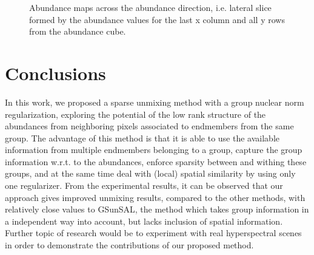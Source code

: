 \documentclass{article}
\newlength\myheight
\begin{document}
\begin{figure}[h!]
	\captionsetup[subfigure]{labelformat=empty,font=small}
	\settoheight{}
	\centering
	 \hspace{1mm} 
	 \hspace{1mm} 
	 \hspace{1mm} 
	 \hspace{1mm} 
	 \hspace{1mm}
	 \hspace{1mm}
	\caption{Abundance maps across the abundance direction, i.e. lateral slice formed by the abundance values for the last x column and all y rows from the abundance cube.  }\label{spec_abun_bands} %
\end{figure}
\section{Conclusions}
In this work, we proposed a sparse unmixing method with a group nuclear norm regularization, 
exploring the potential of the low rank structure of the abundances from neighboring pixels associated 
to endmembers from the same group. The advantage of this method is that it is  able to use the available information from multiple endmembers belonging to a group, capture the group information w.r.t. to the abundances, enforce sparsity between and withing these groups, and at the same time deal with (local) spatial similarity by using only one regularizer.  
From the experimental results, it can be  observed that our approach gives improved unmixing results, compared to the other methods, with relatively close values to GSunSAL, the method which takes group information in a independent way into account, but lacks inclusion of spatial information. Further topic of research would be to experiment with real hyperspectral scenes in order to demonstrate the contributions of our proposed method.

%

\end{document}
